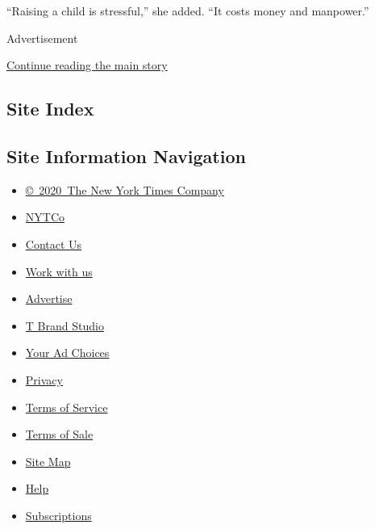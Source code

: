 ``Raising a child is stressful,'' she added. ``It costs money and
manpower.''

Advertisement

\protect\hyperlink{after-bottom}{Continue reading the main story}

\hypertarget{site-index}{%
\subsection{Site Index}\label{site-index}}

\hypertarget{site-information-navigation}{%
\subsection{Site Information
Navigation}\label{site-information-navigation}}

\begin{itemize}
\tightlist
\item
  \href{https://help.nytimes3xbfgragh.onion/hc/en-us/articles/115014792127-Copyright-notice}{©~2020~The
  New York Times Company}
\end{itemize}

\begin{itemize}
\tightlist
\item
  \href{https://www.nytco.com/}{NYTCo}
\item
  \href{https://help.nytimes3xbfgragh.onion/hc/en-us/articles/115015385887-Contact-Us}{Contact
  Us}
\item
  \href{https://www.nytco.com/careers/}{Work with us}
\item
  \href{https://nytmediakit.com/}{Advertise}
\item
  \href{http://www.tbrandstudio.com/}{T Brand Studio}
\item
  \href{https://www.nytimes3xbfgragh.onion/privacy/cookie-policy\#how-do-i-manage-trackers}{Your
  Ad Choices}
\item
  \href{https://www.nytimes3xbfgragh.onion/privacy}{Privacy}
\item
  \href{https://help.nytimes3xbfgragh.onion/hc/en-us/articles/115014893428-Terms-of-service}{Terms
  of Service}
\item
  \href{https://help.nytimes3xbfgragh.onion/hc/en-us/articles/115014893968-Terms-of-sale}{Terms
  of Sale}
\item
  \href{https://spiderbites.nytimes3xbfgragh.onion}{Site Map}
\item
  \href{https://help.nytimes3xbfgragh.onion/hc/en-us}{Help}
\item
  \href{https://www.nytimes3xbfgragh.onion/subscription?campaignId=37WXW}{Subscriptions}
\end{itemize}
